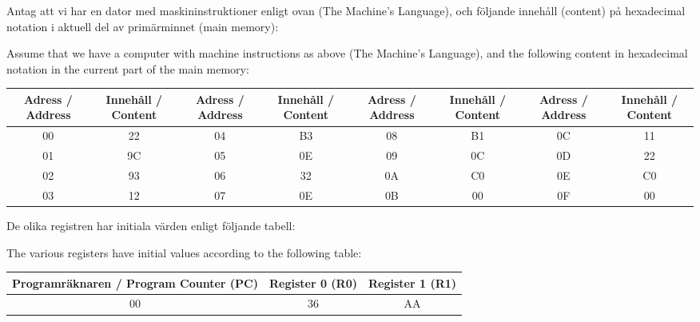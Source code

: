 
Antag att vi har en dator med maskininstruktioner enligt ovan (The Machine's Language), och följande innehåll (content) på hexadecimal notation i aktuell del av primärminnet (main memory):

Assume that we have a computer with machine instructions as above (The Machine's Language), and the following content in hexadecimal notation in the current part of the main memory:

\begin{center}
\begin{tabular}{|c|c|c|c|c|c|c|c|}
\hline
\textbf{Adress / Address} & \textbf{Innehåll / Content} & \textbf{Adress / Address} & \textbf{Innehåll / Content} & \textbf{Adress / Address} & \textbf{Innehåll / Content} & \textbf{Adress / Address} & \textbf{Innehåll / Content} \\
\hline
00 & 22 & 04 & B3 & 08 & B1 & 0C & 11 \\
01 & 9C & 05 & 0E & 09 & 0C & 0D & 22 \\
02 & 93 & 06 & 32 & 0A & C0 & 0E & C0 \\
03 & 12 & 07 & 0E & 0B & 00 & 0F & 00 \\
\hline
\end{tabular}
\end{center}

De olika registren har initiala värden enligt följande tabell:

The various registers have initial values according to the following table:

\begin{center}
\begin{tabular}{|c|c|c|}
\hline
\textbf{Programräknaren / Program Counter (PC)} & \textbf{Register 0 (R0)} & \textbf{Register 1 (R1)} \\
\hline
00 & 36 & AA \\
\hline
\end{tabular}
\end{center}
